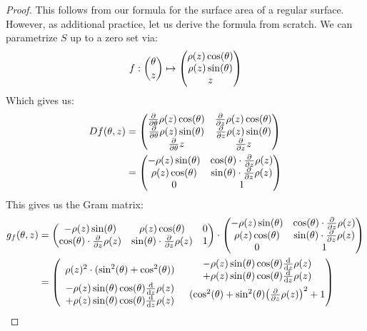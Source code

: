 \begin{proof}
	This follows from our formula for the surface area of a regular surface.
	However, as additional practice, let us derive the formula from scratch.
	We can parametrize $S$ up to a zero set via:
	\begin{align*}
		f: \binom{\theta}{z} \mapsto \begin{pmatrix} \rho(z) \cos(\theta)\\\rho(z) \sin(\theta)\\z\end{pmatrix}
	\end{align*}
	Which gives us:
	\begin{align*}
		Df(\theta,z)
		&=
		\begin{pmatrix}
			\pdv{\theta} \rho(z) \cos(\theta) & \pdv{z} \rho(z) \cos(\theta)\\
			\pdv{\theta} \rho(z) \sin(\theta) & \pdv{z} \rho(z) \sin(\theta)\\
			\pdv{\theta} z & \pdv{z} z
		\end{pmatrix}\\
		&=
		\begin{pmatrix}
			-\rho(z) \sin(\theta) & \cos(\theta) \cdot \pdv{z} \rho(z)\\
			\rho(z) \cos(\theta) & \sin(\theta) \cdot \pdv{z} \rho(z)\\
			0 & 1
		\end{pmatrix}
	\end{align*}
	This gives us the Gram matrix:
	\begin{align*}
		g_f(\theta,z) &=
		\begin{pmatrix}
			-\rho(z) \sin(\theta) & \rho(z) \cos(\theta) & 0\\
			\cos(\theta) \cdot \pdv{z} \rho(z)
			& \sin(\theta) \cdot \pdv{z} \rho(z)& 1
		\end{pmatrix}
		\cdot
		\begin{pmatrix}
			-\rho(z) \sin(\theta) & \cos(\theta) \cdot \pdv{z} \rho(z)\\
			\rho(z) \cos(\theta) & \sin(\theta) \cdot \pdv{z} \rho(z)\\
			0 & 1
		\end{pmatrix}\\
		&=
		\begin{pmatrix}
			\rho(z)^2 \cdot (\sin^2(\theta) + \cos^2(\theta)) & \stack{-\rho(z)\sin(\theta)\cos(\theta) \dv{z}\rho(z)}
			{+ \rho(z)\sin(\theta)\cos(\theta) \dv{z}\rho(z)}\\
			\stack{-\rho(z)\sin(\theta)\cos(\theta) \dv{z}\rho(z)}
			{+ \rho(z)\sin(\theta)\cos(\theta) \dv{z}\rho(z)} & (\cos^2(\theta) + \sin^2(\theta)\lr(\pdv{z} \rho(z))^2 + 1
		\end{pmatrix}\\

\end{align*}
\end{proof}
